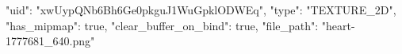 {
    "uid": "xwUypQNb6Bh6Ge0pkguJ1WuGpklODWEq",
    "type": "TEXTURE_2D",
    "has_mipmap": true,
    "clear_buffer_on_bind": true,
    "file_path": "heart-1777681_640.png"
}